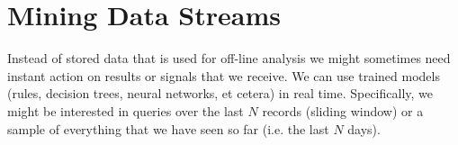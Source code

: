 \section{Mining Data Streams}

Instead of stored data that is used for off-line analysis
we might sometimes need instant action on results or signals
that we receive. We can use trained models (rules, decision trees,
neural networks, et cetera) in real time. Specifically, we might
be interested in queries over the last $N$ records (sliding window)
or a sample of everything that we have seen so far (i.e. the last $N$ days).

